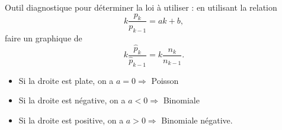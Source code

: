 Outil diagnostique pour déterminer la loi à utiliser : en utilisant la relation $$k\frac{p_k}{p_{k-1}} = ak + b,$$
faire un graphique de 
$$k \frac{\hat{p}_k}{\hat{p}_{k-1}} = k\frac{n_k}{n_{k-1}}.$$
\begin{itemize}
	\item Si la droite est plate, on a $a = 0\Rightarrow$ Poisson
	\item Si la droite est négative, on a $a < 0\Rightarrow$ Binomiale
	\item Si la droite est positive, on a $a > 0\Rightarrow$ Binomiale négative.
\end{itemize}






























